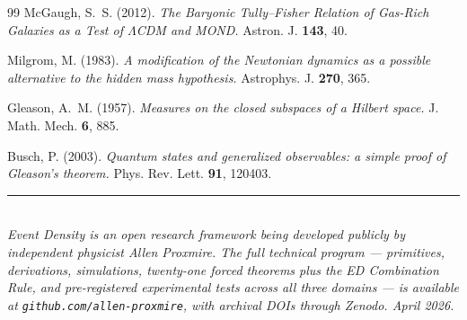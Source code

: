 \documentclass[11pt,a4paper]{article}
\begin{document}
\begin{thebibliography}{99}
 McGaugh, S.~S. (2012). \emph{The Baryonic Tully--Fisher Relation of Gas-Rich Galaxies as a Test of $\Lambda$CDM and MOND.} Astron. J. \textbf{143}, 40.

 Milgrom, M. (1983). \emph{A modification of the Newtonian dynamics as a possible alternative to the hidden mass hypothesis.} Astrophys. J. \textbf{270}, 365.

 Gleason, A.~M. (1957). \emph{Measures on the closed subspaces of a Hilbert space.} J. Math. Mech. \textbf{6}, 885.

 Busch, P. (2003). \emph{Quantum states and generalized observables: a simple proof of Gleason's theorem.} Phys. Rev. Lett. \textbf{91}, 120403.

\end{thebibliography}

\vfill
\noindent\rule{\textwidth}{0.4pt}\\
\textit{Event Density is an open research framework being developed publicly by independent physicist Allen Proxmire. The full technical program --- primitives, derivations, simulations, twenty-one forced theorems plus the ED Combination Rule, and pre-registered experimental tests across all three domains --- is available at \texttt{github.com/allen-proxmire}, with archival DOIs through Zenodo. April 2026.}
\end{document}
